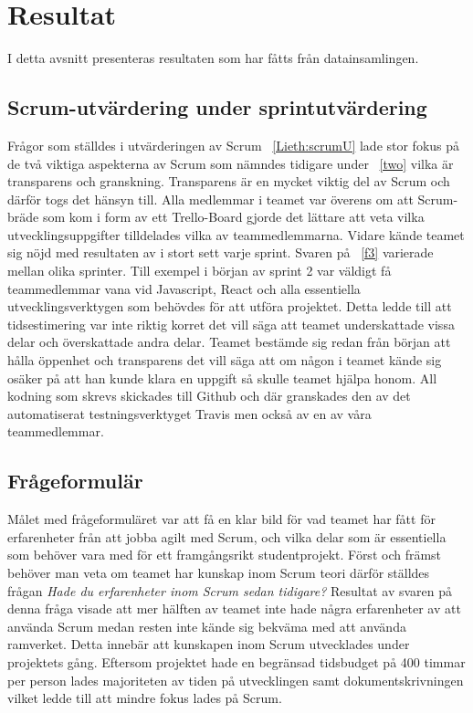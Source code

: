 \section{Resultat}
\label{sec:Lieth_Wahid-results}
I detta avsnitt presenteras resultaten som har fåtts från datainsamlingen.
\subsection{Scrum-utvärdering under sprintutvärdering}
Frågor som ställdes i utvärderingen av Scrum ~\ref{Lieth:scrumU} lade stor fokus på de två viktiga aspekterna av Scrum som nämndes tidigare under ~\ref{two} vilka är transparens och granskning.
Transparens är en mycket viktig del av Scrum och därför togs det hänsyn till. Alla medlemmar i teamet var överens om att Scrum-bräde som kom i form av ett Trello-Board gjorde det lättare att veta vilka 
utvecklingsuppgifter tilldelades vilka av teammedlemmarna. Vidare kände teamet sig nöjd med resultaten av i stort sett varje sprint. Svaren på ~\ref{f3} varierade mellan olika sprinter. Till exempel i början av sprint 2 var väldigt få teammedlemmar vana vid Javascript, React och alla essentiella utvecklingsverktygen som behövdes för att utföra projektet. Detta ledde till att tidsestimering var inte riktig korret det vill säga att teamet underskattade vissa delar och överskattade andra delar. Teamet bestämde sig redan från
början att hålla öppenhet och transparens det vill säga att om någon i teamet kände sig osäker på att han kunde klara en uppgift så skulle teamet hjälpa honom. All kodning som skrevs skickades till Github och där granskades den av det automatiserat testningsverktyget Travis men också av en av våra teammedlemmar.

\subsection{Frågeformulär}
Målet med frågeformuläret var att få en klar bild för vad teamet har fått för erfarenheter från att jobba agilt med Scrum, och vilka delar som är essentiella som behöver vara med för ett framgångsrikt studentprojekt. Först och främst behöver man veta om teamet har kunskap inom Scrum teori därför ställdes frågan \textit{Hade du erfarenheter inom Scrum sedan tidigare? } Resultat av svaren på denna fråga visade att mer hälften av teamet inte hade några erfarenheter av att använda Scrum medan resten inte kände sig bekväma med att använda ramverket. Detta innebär att kunskapen inom Scrum utvecklades under projektets gång. Eftersom projektet hade en begränsad tidsbudget på 400 timmar per person lades majoriteten av tiden på utvecklingen samt dokumentskrivningen vilket ledde till att mindre fokus lades på Scrum.  

